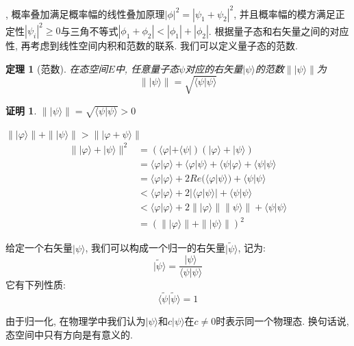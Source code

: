 \documentclass[a4paper,11pt]{article}
\theoremstyle{mystyle}
\newtheorem{theorem}{\hspace{2em}定理}[section]
\newtheorem{Proof}{\hspace{2em}证明}[section]
\begin{document}
, 概率叠加满足概率幅的线性叠加原理$|\phi|^2=|\psi_1+\psi_2|^2$, 并且概率幅的模方满足正定性$|\psi_i|^2\geq 0$与三角不等式$|\phi_1+\phi_2|<|\phi_1|+|\phi_2|$. 根据量子态和右矢量之间的对应性, 再考虑到线性空间内积和范数的联系. 我们可以定义量子态的范数.
\begin{theorem}[范数]\label{ket norm}
  在态空间$E$中, 任意量子态$\psi$对应的右矢量$|\psi\rangle$的范数$\||\psi\rangle\|$为
\begin{equation*}
  \||\psi\rangle\|=\sqrt{\langle\psi|\psi\rangle}
\end{equation*}
\end{theorem}
\begin{Proof}
  $\||\psi\rangle\|=\sqrt{\langle\psi|\psi\rangle}>0$

$\||\varphi\rangle\|+\||\psi\rangle\|>\||\varphi+\psi\rangle\|$
\begin{equation*}
  \begin{split}
     \||\varphi\rangle+|\psi\rangle\|^2 & =(\langle\varphi|+\langle\psi|)(|\varphi\rangle+|\psi\rangle) \\
       & =\langle\varphi|\varphi\rangle+\langle\varphi|\psi\rangle+\langle\psi|\varphi\rangle+\langle\psi|\psi\rangle \\
       & =\langle\varphi|\varphi\rangle+2Re(\langle\varphi|\psi\rangle)+\langle\psi|\psi\rangle\\
       & <\langle\varphi|\varphi\rangle+2|\langle\varphi|\psi\rangle|+\langle\psi|\psi\rangle\\
       & <\langle\varphi|\varphi\rangle+2\||\varphi\rangle\|\|\psi\rangle\|+\langle\psi|\psi\rangle\\
       & =(\||\varphi\rangle\|+\||\psi\rangle\|)^2
  \end{split}
\end{equation*}
\end{Proof}
\begin{definition}\label{ket normalization}
  给定一个右矢量$|\psi\rangle$, 我们可以构成一个归一的右矢量$|\tilde{\psi}\rangle$, 记为:
\begin{equation*}
  |\tilde{\psi}\rangle=\frac{|\psi\rangle}{\langle\psi|\psi\rangle}
\end{equation*}
它有下列性质:
\begin{equation*}
  \langle\tilde{\psi}|\tilde{\psi}\rangle=1
\end{equation*}
\end{definition}
由于归一化, 在物理学中我们认为$|\psi\rangle$和$c|\psi\rangle$在$c\neq0$时表示同一个物理态. 换句话说, 态空间中只有方向是有意义的.
\end{document}
